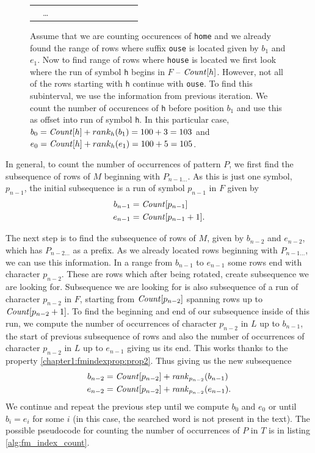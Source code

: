 \begin{figure}
{\begin{tabular}{c|c|l|l|l|l|l|l|l|l|l|l|}
	                & \ldots     &   &  &   &   &   &   &   &   &   &   \\ \cline{5-10}\cline{2-3}\cline{12-12}
	\end{tabular}
	}
	\caption[TODO]{Assume that we are counting occurences of \texttt{home} and we already found the
	range of rows where suffix \texttt{ouse} is located given by $b_1$ and $e_1$. Now to find range
	of rows where \texttt{house} is located we first look where the run of symbol \texttt{h} begins
	in $F$ -- $\mathit{Count}[h]$. However, not all of the rows starting with \texttt{h} continue with
	\texttt{ouse}. To find this subinterval, we use the information from previous iteration. We count
	the number of occurences of \texttt{h} before position $b_1$ and use this as offset into run of
	symbol \texttt{h}. In this particular case, $b_0 = \mathit{Count}[h] + rank_h(b_1) = 100 + 3 = 103$ and
	$e_0 = \mathit{Count}[h] + rank_h(e_1) = 100 + 5 = 105$.
	}
	\label{tab:fm_index_example}
\end{figure}

In general, to count the number of occurrences of pattern $P$, we first find the subsequence of rows of $M$
beginning with $P_{n-1\ldots}$. As this is just one symbol, $p_{n-1}$, the initial subsequence is a run
of symbol $p_{n-1}$ in $F$ given by
\begin{align*}
	b_{n-1}&=\mathit{Count}[p_{n-1}] \\
	e_{n-1}&=\mathit{Count}[p_{n-1}+1].\\
\end{align*}

The next step is to find the subsequence of rows of $M$, given by $b_{n-2}$ and $e_{n-2}$, which has
$P_{n-2\ldots}$ as a prefix. As we already located rows beginning with $P_{n-1\ldots}$, we can use
this information. In a range from $b_{n-1}$ to $e_{n-1}$ some rows end with character $p_{n-2}$. These
are rows which after being rotated, create subsequence we are looking for. Subsequence we are looking
for is also subsequence of a run of character $p_{n-2}$ in $F$, starting from $\mathit{Count}[p_{n-2}]$ spanning
rows up to $\mathit{Count}[p_{n-2}+1]$. To find the beginning and end of our subsequence inside of this run, we
compute the number of occurrences of character $p_{n-2}$ in $L$ up to $b_{n-1}$, the start of previous
subsequence of rows and also the number of occurrences of character $p_{n-2}$ in $L$ up to $e_{n-1}$
giving us its end. This works thanks to the property \ref{chapter1:fmindexprop:prop2}. Thus giving us the
new subsequence
\begin{align*}
	b_{n-2}&=\mathit{Count}[p_{n-2}] + \mathit{rank}_{p_{n-2}}(b_{n-1}) \\
	e_{n-2}&=\mathit{Count}[p_{n-2}] + \mathit{rank}_{p_{n-2}}(e_{n-1}).\\
\end{align*}
We continue and repeat the previous step until we compute $b_0$ and $e_0$ or until $b_i=e_i$ for some $i$
(in this case, the searched word is not present in the text). The possible pseudocode for counting the number
of occurrences of $P$ in $T$ is in listing \ref{alg:fm_index_count}.

